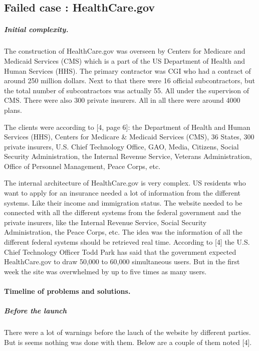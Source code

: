 \documentclass[]{article}
\date{}
\let\oldparagraph\paragraph
\renewcommand{\paragraph}[1]{\oldparagraph{#1}\mbox{}}
\let\oldsubparagraph\subparagraph
\renewcommand{\subparagraph}[1]{\oldsubparagraph{#1}\mbox{}}
\begin{document}
\subsection{Failed case :
HealthCare.gov}\label{failed-case-healthcare.gov}

\subparagraph{Initial complexity.}\label{initial-complexity.}

The construction of HealthCare.gov was overseen by Centers for Medicare
and Medicaid Services (CMS) which is a part of the US Department of
Health and Human Services (HHS). The primary contractor was CGI who had
a contract of around 250 million dollars. Next to that there were 16
official subcontractors, but the total number of subcontractors was
actually 55. All under the supervison of CMS. There were also 300
private insurers. All in all there were around 4000 plans.

The clients were according to {[}4, page 6{]}: the Department of Health
and Human Services (HHS), Centers for Medicare \& Medicaid Services
(CMS), 36 States, 300 private insurers, U.S. Chief Technology Office,
GAO, Media, Citizens, Social Security Administration, the Internal
Revenue Service, Veterans Administration, Office of Personnel
Management, Peace Corps, etc.

The internal architecture of HealthCare.gov is very complex. US
residents who want to apply for an insurance needed a lot of information
from the different systems. Like their income and immigration status.
The website needed to be connected with all the different systems from
the federal government and the private insurers, like the Internal
Revenue Service, Social Security Administration, the Peace Corps, etc.
The idea was the information of all the different federal systems should
be retrieved real time. According to {[}4{]} the U.S. Chief Technology
Officer Todd Park has said that the government expected HealthCare.gov
to draw 50,000 to 60,000 simultaneous users. But in the first week the
site was overwhelmed by up to five times as many users.

\paragraph{Timeline of problems and
solutions.}\label{timeline-of-problems-and-solutions.}

\subparagraph{Before the launch}\label{before-the-launch}

There were a lot of warnings before the lauch of the website by
different parties. But is seems nothing was done with them. Below are a
couple of them noted {[}4{]}.
\end{document}
